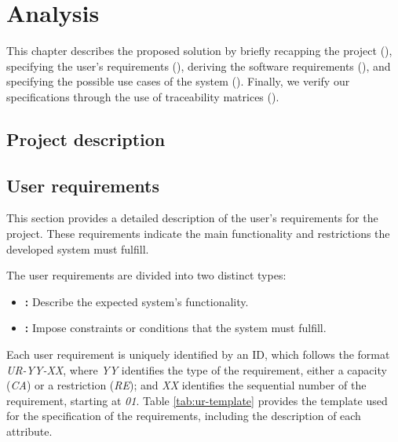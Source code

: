 \chapter{Analysis}\label{chap:analysis}
This chapter describes the proposed solution by briefly recapping the project (), specifying the user's requirements (), deriving the software requirements (), and specifying the possible use cases of the system (). Finally, we verify our specifications through the use of traceability matrices ().



\section{Project description}\label{sec:project-description}



\section{User requirements}\label{sec:user-requirements}
This section provides a detailed description of the user's requirements for the project. These requirements indicate the main functionality and restrictions the developed system must fulfill.

The user requirements are divided into two distinct types:
\begin{itemize}[noitemsep]
  \item \textbf{:} Describe the expected system's functionality.
  \item \textbf{:} Impose constraints or conditions that the system must fulfill.
\end{itemize}

Each user requirement is uniquely identified by an ID, which follows the format \textit{UR-YY-XX}, where \textit{YY} identifies the type of the requirement, either a capacity (\textit{CA}) or a restriction (\textit{RE}); and \textit{XX} identifies the sequential number of the requirement, starting at \textit{01}. Table \ref{tab:ur-template} provides the template used for the specification of the requirements, including the description of each attribute.



